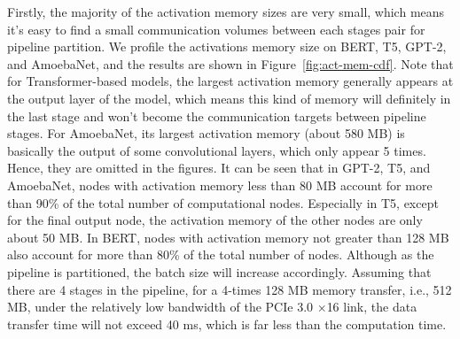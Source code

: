 Firstly, the majority of the activation memory sizes are very small,
which means it's easy to find a small communication volumes between
each stages pair for pipeline partition.
We profile the activations memory size on BERT, T5, GPT-2, and AmoebaNet,
and the results are shown in Figure~\ref{fig:act-mem-cdf}.
Note that for Transformer-based models,
the largest activation memory generally appears at
the output layer of the model,
which means this kind of memory will definitely
in the last stage and won't become the communication targets between pipeline stages.
For AmoebaNet, its largest activation memory (about 580 MB) is
basically the output of some convolutional layers, which only appear 5 times.
Hence, they are omitted in the figures.
It can be seen that in GPT-2, T5, and AmoebaNet,
nodes with activation memory less than 80 MB
account for more than 90\% of the total number of computational nodes.
Especially in T5, except for the final output node,
the activation memory of the other nodes are only about 50 MB.
In BERT, nodes with activation memory not greater
than 128 MB also account for more than 80\% of the total number of nodes.
Although as the pipeline is partitioned, the batch size will increase accordingly.
Assuming that there are 4 stages in the pipeline,
for a 4-times 128 MB memory transfer, i.e., 512 MB,
under the relatively low bandwidth of the PCIe 3.0 $\times$16 link,
the data transfer time will not exceed 40 ms,
which is far less than the computation time.



